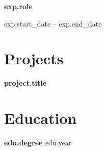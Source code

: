 \documentclass[11pt]{article}
\begin{document}
{{{{{{{{{%

\noindent \textbf{ {{ exp.role }} }
{%
\hfill {\small {{ exp.start_date }} -- {{ exp.end_date }}}


\vspace{4pt}

{%

{%


{%

\section*{Projects}

{%

\noindent \textbf{ {{ project.title }} }
{%


\vspace{4pt}

{%

{%


{%

\section*{Education}

{%

\noindent \textbf{ {{ edu.degree }} } \hfill {\small {{ edu.year }}}


}}}}}}}}}}}}}}}}}}}
\end{document}
